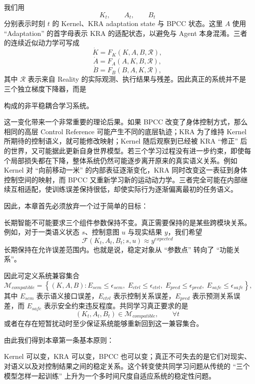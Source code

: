 我们用
\[
K_t,\qquad A_t,\qquad B_t
\]
分别表示时刻 $t$ 的 Kernel、KRA adaptation state 与 BPCC 状态。这里 $A$ 使用 ``Adaptation'' 的首字母表示 KRA 的适配状态，以避免与 Agent 本身混淆。三者的连续近似动力学可写成
\[
\dot K
=
F_K
\left(
K,A,B,\mathcal{R}
\right),
\]
\[
\dot A
=
F_A
\left(
A,K,B,\mathcal{R}
\right),
\]
\[
\dot B
=
F_B
\left(
B,A,K,\mathcal{R}
\right),
\]
其中 $\mathcal{R}$ 表示来自 Reality 的实际观测、执行结果与残差。因此真正的系统并不是三个独立梯度下降器，而是
\begin{statementbox}
\centering
{}
\end{statementbox}
构成的非平稳耦合学习系统。

这一变化带来一个非常重要的理论后果。如果 BPCC 改变了身体控制方式，那么相同的高层 Control Reference 可能产生不同的底层轨迹；KRA 为了维持 Kernel 所期待的控制语义，就可能修改映射；Kernel 随后观察到已经被 KRA ``修正'' 后的世界，又可能据此更新自身世界模型。若三个学习过程没有进一步约束，即使每个局部损失都在下降，整体系统仍然可能逐步离开原来的真实语义关系。例如 Kernel 对 ``向前移动一米'' 的内部表征逐渐变化，KRA 同时改变这一表征到身体控制空间的映射，而 BPCC 又重新学习新的运动动力学。三者完全可能在内部继续互相适配，使训练误差保持很低，却使实际行为逐渐偏离最初的任务语义。

因此，本章首先必须放弃一个过于简单的目标：
\begin{statementbox}
\centering
{}
\end{statementbox}
长期智能不可能要求三个组件参数保持不变。真正需要保持的是某些跨模块关系。例如，对于一类语义状态 $s$、控制意图 $u$ 与现实结果 $y$，我们希望
\[
\mathcal{F}
\left(
K_t,A_t,B_t;s,u
\right)
\approx
y^{expected}
\]
长期保持在允许误差范围内。也就是说，稳定对象从 ``参数点'' 转向了 ``功能关系''。

因此可定义系统兼容集合
\[
\boxed{
\mathcal{M}_{compatible}
=
\left\{
(K,A,B):
E_{sem}\leq\epsilon_{sem},
\;
E_{ctrl}\leq\epsilon_{ctrl},
\;
E_{pred}\leq\epsilon_{pred},
\;
E_{safe}\leq\epsilon_{safe}
\right\},
}
\]
其中 $E_{sem}$ 表示语义接口误差，$E_{ctrl}$ 表示控制关系误差，$E_{pred}$ 表示预测关系误差，而 $E_{safe}$ 表示安全约束违反程度。共同学习真正要求的是
\[
\boxed{
(K_t,A_t,B_t)\in\mathcal{M}_{compatible},
\qquad
\forall t
}
\]
或者在存在短暂扰动时至少保证系统能够重新回到这一兼容集合。

由此我们得到本章第一条基本原则：
\begin{statementbox}
\centering
{}
\end{statementbox}
Kernel 可以变，KRA 可以变，BPCC 也可以变；真正不可失去的是它们对现实、对语义以及对控制结果之间的稳定关系。这个转变使共同学习问题从传统的 ``三个模型怎样一起训练'' 上升为一个多时间尺度自适应系统的稳定性问题。

